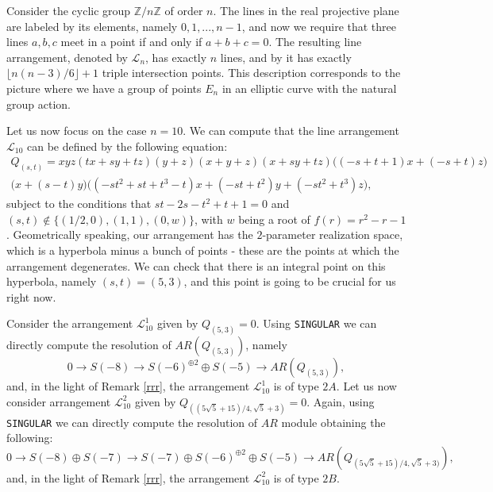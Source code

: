 \documentclass[12pt]{article}
\theoremstyle{plain}
\theoremstyle{definition}
\begin{document}
Consider the cyclic group $\mathbb{Z}/n\mathbb{Z}$ of order $n$. The lines in the real projective plane are labeled by
its elements, namely $0,1,...,n-1$, and now we require that three lines $a,b,c$ meet in a point if and
only if $a+b+c = 0$. The resulting line arrangement, denoted by $\mathcal{L}_{n}$, has exactly $n$ lines, and by \cite[Proposition 2.6]{Green} it has exactly $\lfloor n(n-3)/6\rfloor + 1$ triple intersection points. This description corresponds to the picture where we have a group of points $E_{n}$ in an elliptic curve with the natural group action. 

Let us now focus on the case $n=10$. We can compute that the line arrangement $\mathcal{L}_{10}$ can be defined by the following equation:
\begin{multline*}
Q_{(s,t)} = xyz(tx+sy+tz)(y+z)(x+y+z)(x+sy+tz)\bigg((-s+t+1)x+(-s+t)z\bigg) \\ \bigg(x+(s-t)y\bigg) \bigg((-st^2+st+t^3-t)x+(-st+t^2)y+(-st^2+t^3)z\bigg),    
\end{multline*}
subject to the conditions that $st - 2s - t^2 + t + 1 =0$ and $(s,t) \not\in \{{ (1/2,0), (1,1), (0,w) }\}$, with $w$ being a root of $f(r) = r^{2}-r-1$. Geometrically speaking, our arrangement has the $2$-parameter realization space, which is a hyperbola minus a bunch of points - these are the points at which the arrangement degenerates. We can check that there is an integral point on this hyperbola, namely $(s,t)=(5,3)$, and this point is going to be crucial for us right now.

Consider the arrangement $\mathcal{L}_{10}^{1}$ given by $Q_{(5,3)}=0$. Using \verb}SINGULAR} we can directly compute the resolution of $AR(Q_{(5,3)})$, namely 
\begin{equation*}
0\rightarrow S(-8) \rightarrow S(-6)^{\oplus2} \oplus S(-5) \rightarrow AR(Q_{(5,3)}),
\end{equation*}
and, in the light of Remark \ref{rrr}, the arrangement $\mathcal{L}_{10}^{1}$ is of type $2A$. Let us now consider arrangement $\mathcal{L}^{2}_{10}$ given by $Q_{((5\sqrt{5}+15)/4, \sqrt{5}+3)} = 0$. Again, using \verb}SINGULAR} we can directly compute the resolution of $AR$ module obtaining the following:
\begin{equation*}
0\rightarrow S(-8) \oplus S(-7) \rightarrow S(-7) \oplus S(-6)^{\oplus2} \oplus S(-5) \rightarrow AR(Q_{(5\sqrt{5}+15)/4,\sqrt{5}+3)}),
\end{equation*}
and, in the light of Remark \ref{rrr}, the arrangement $\mathcal{L}_{10}^{2}$ is of type $2B$. 
\end{document}
